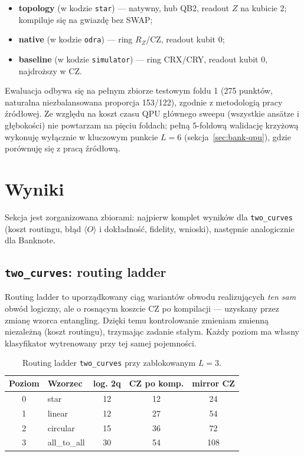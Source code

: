 \documentclass[11pt,a4paper]{article}
\begin{document}
\begin{itemize}
\item \textbf{topology} (w kodzie \texttt{star}) --- natywny, hub QB2, readout $Z$ na
      kubicie 2; kompiluje się na gwiazdę bez SWAP;
\item \textbf{native} (w kodzie \texttt{odra}) --- ring $R_Z$/CZ, readout kubit 0;
\item \textbf{baseline} (w kodzie \texttt{simulator}) --- ring CRX/CRY, readout
      kubit 0, najdroższy w CZ.
\end{itemize}

Ewaluacja odbywa się na pełnym zbiorze testowym foldu 1 (275 punktów, naturalna
niezbalansowana proporcja 153/122), zgodnie z metodologią pracy źródłowej. Ze względu na
koszt czasu QPU głównego sweepu (wszystkie ansätze i głębokości) nie powtarzam na pięciu
foldach; pełną 5-foldową walidację krzyżową wykonuję wyłącznie w kluczowym punkcie $L=6$
(sekcja~\ref{sec:bank-qpu}), gdzie porównuję się z pracą źródłową.

\section{Wyniki}

Sekcja jest zorganizowana zbiorami: najpierw komplet wyników dla \texttt{two\_curves}
(koszt routingu, błąd $\langle O\rangle$ i dokładność, fidelity, wnioski), następnie
analogicznie dla Banknote.

\subsection{\texttt{two\_curves}: routing ladder}

Routing ladder to uporządkowany ciąg wariantów obwodu realizujących \emph{ten sam} obwód
logiczny, ale o rosnącym koszcie CZ po kompilacji --- uzyskany przez zmianę wzorca
entangling. Dzięki temu kontrolowanie zmieniam zmienną niezależną (koszt routingu),
trzymając zadanie stałym. Każdy poziom ma własny klasyfikator wytrenowany przy tej samej
pojemności.

\begin{table}[htbp]
\centering
\caption{Routing ladder \texttt{two\_curves} przy zablokowanym $L=3$.}
\label{tab:tc-ladder}
\begin{tabular}{@{}clccc@{}}
\toprule
Poziom & Wzorzec & log. 2q & CZ po komp. & mirror CZ \\
\midrule
0 & star       & 12 & 12 & 24  \\
1 & linear     & 12 & 27 & 54  \\
2 & circular   & 15 & 36 & 72  \\
3 & all\_to\_all & 30 & 54 & 108 \\
\bottomrule
\end{tabular}
\end{table}
\end{document}
